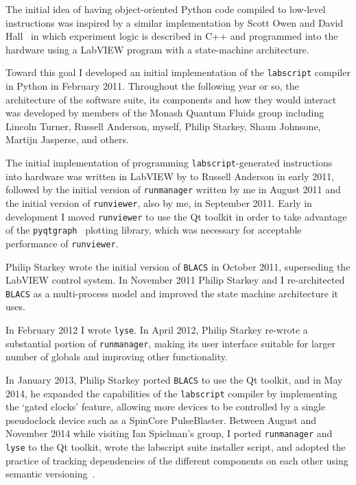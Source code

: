 The initial idea of having object-oriented Python code compiled to low-level instructions was inspired by a similar implementation by Scott Owen and David Hall~\cite{owen_fast_2003} in which experiment logic is described in C++ and programmed into the hardware using a LabVIEW program with a state-machine architecture.

Toward this goal I developed an initial implementation of the \texttt{labscript} compiler in Python in February 2011. Throughout the following year or so, the architecture of the software suite, its components and how they would interact was developed by members of the Monash Quantum Fluids group including Lincoln Turner, Russell Anderson, myself, Philip Starkey, Shaun Johnsone, Martijn Jasperse, and others.

The initial implementation of programming \texttt{labscript}-generated instructions into hardware was written in LabVIEW by to Russell Anderson in early 2011, followed by the initial version of \texttt{runmanager} written by me in August 2011 and the initial version of \texttt{runviewer}, also by me, in September 2011. Early in development I moved \texttt{runviewer} to use the Qt toolkit in order to take advantage of the \texttt{pyqtgraph}~\cite{campagnola_pyqtgraph_2016} plotting library, which was necessary for acceptable performance of \texttt{runviewer}.

Philip Starkey wrote the initial version of \texttt{BLACS} in October 2011, superseding the LabVIEW control system. In November 2011 Philip Starkey and I re-architected \texttt{BLACS} as a multi-process model and improved the state machine architecture it uses.

In February 2012 I wrote \texttt{lyse}. In April 2012, Philip Starkey re-wrote a substantial portion of \texttt{runmanager}, making its user interface suitable for larger number of globals and improving other functionality.

In January 2013, Philip Starkey ported \texttt{BLACS} to use the Qt toolkit, and in May 2014, he expanded the capabilities of the \texttt{labscript} compiler by implementing the `gated clocks' feature, allowing more devices to be controlled by a single pseudoclock device such as a SpinCore PulseBlaster. Between August and November 2014 while visiting Ian Spielman's group, I ported \texttt{runmanager} and \texttt{lyse} to the Qt toolkit, wrote the labscript suite installer script, and adopted the practice of tracking dependencies of the different components on each other using semantic versioning~\cite{tom_preston-werner_semantic_2018}.

